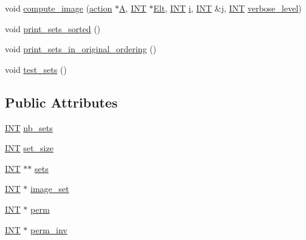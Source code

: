 \begin{DoxyCompactItemize}
\item 
void \mbox{\hyperlink{classaction__on__sets_a4e97b6c049755220ec5a2ef12397da01}{compute\+\_\+image}} (\mbox{\hyperlink{classaction}{action}} $\ast$\mbox{\hyperlink{simeon_8_c_a97833f04c3a9c008df5521a2fc291bb4}{A}}, \mbox{\hyperlink{galois_8h_a09fddde158a3a20bd2dcadb609de11dc}{I\+NT}} $\ast$\mbox{\hyperlink{simeon_8_c_aec1406935bdb1fee3561fcb840964100}{Elt}}, \mbox{\hyperlink{galois_8h_a09fddde158a3a20bd2dcadb609de11dc}{I\+NT}} \mbox{\hyperlink{alphabet2_8_c_acb559820d9ca11295b4500f179ef6392}{i}}, \mbox{\hyperlink{galois_8h_a09fddde158a3a20bd2dcadb609de11dc}{I\+NT}} \&\mbox{\hyperlink{alphabet2_8_c_a37d972ae0b47b9099e30983131d31916}{j}}, \mbox{\hyperlink{galois_8h_a09fddde158a3a20bd2dcadb609de11dc}{I\+NT}} \mbox{\hyperlink{simeon_8_c_a818073fbcc2f439e7c56952f67386122}{verbose\+\_\+level}})
\item 
void \mbox{\hyperlink{classaction__on__sets_a8128e6978ca76ba293eb29fb538ccf9e}{print\+\_\+sets\+\_\+sorted}} ()
\item 
void \mbox{\hyperlink{classaction__on__sets_a9afacc3b96a530fc87d8f3ac3af27330}{print\+\_\+sets\+\_\+in\+\_\+original\+\_\+ordering}} ()
\item 
void \mbox{\hyperlink{classaction__on__sets_a6f12bee3bce03634199932d6aedd6b6c}{test\+\_\+sets}} ()
\end{DoxyCompactItemize}
\subsection*{Public Attributes}
\begin{DoxyCompactItemize}
\item 
\mbox{\hyperlink{galois_8h_a09fddde158a3a20bd2dcadb609de11dc}{I\+NT}} \mbox{\hyperlink{classaction__on__sets_aa9fa82b5197bdc7ed7ee442928eb433c}{nb\+\_\+sets}}
\item 
\mbox{\hyperlink{galois_8h_a09fddde158a3a20bd2dcadb609de11dc}{I\+NT}} \mbox{\hyperlink{classaction__on__sets_abfc32ee43a067df299af027da0fdd0be}{set\+\_\+size}}
\item 
\mbox{\hyperlink{galois_8h_a09fddde158a3a20bd2dcadb609de11dc}{I\+NT}} $\ast$$\ast$ \mbox{\hyperlink{classaction__on__sets_ac42ac0622c5d0e65eb821f50c214164c}{sets}}
\item 
\mbox{\hyperlink{galois_8h_a09fddde158a3a20bd2dcadb609de11dc}{I\+NT}} $\ast$ \mbox{\hyperlink{classaction__on__sets_a5fd89d54e9471a68f63243b8f3662ce0}{image\+\_\+set}}
\item 
\mbox{\hyperlink{galois_8h_a09fddde158a3a20bd2dcadb609de11dc}{I\+NT}} $\ast$ \mbox{\hyperlink{classaction__on__sets_aff0e3ae9593ec5848a103ff59cc614b2}{perm}}
\item 
\mbox{\hyperlink{galois_8h_a09fddde158a3a20bd2dcadb609de11dc}{I\+NT}} $\ast$ \mbox{\hyperlink{classaction__on__sets_a0265b68d3f04e49e17ca972e622f0a67}{perm\+\_\+inv}}
\end{DoxyCompactItemize}
